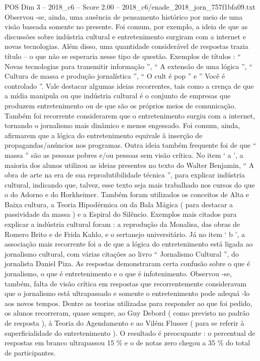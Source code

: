 \begin{textsample}{POS Dim 3 – 2018\_c6 – Score 2.00 – 2018\_c6/enade\_2018\_jorn\_757f1bfa09.txt}
Observou -se, ainda, uma ausência de pensamento histórico por meio de uma visão baseada somente no presente.
Foi comum, por exemplo, a ideia de que as discussões sobre indústria cultural e entretenimento surgiram com a internet e novas tecnologias.
Além disso, uma quantidade considerável de respostas trazia título – o que não se esperaria nesse tipo de questão.
Exemplos de títulos : “ Novas tecnologias para transmitir informação ”, “ A extensão de uma lógica ”, “ Cultura de massa e produção jornalística ”, “ O cult é pop ” e ” Você é controlado ”.
Vale destacar algumas ideias recorrentes, tais como a crença de que a mídia manipula ou que indústria cultural é o conjunto de empresas que produzem entretenimento ou de que são os próprios meios de comunicação.
Também foi recorrente considerarem que o entretenimento surgiu com a internet, tornando o jornalismo mais dinâmico e menos engessado.
Foi comum, ainda, afirmarem que a lógica do entretenimento equivale à inserção de propagandas/anúncios nos programas.
Outra ideia também frequente foi de que “ massa ” são as pessoas pobres e/ou pessoas sem visão crítica.
No item ‘ a ’, a maioria dos alunos utilizou as ideias presentes no texto do Walter Benjamin, “ A obra de arte na era de sua reprodutibilidade técnica ”, para explicar indústria cultural, indicando que, talvez, esse texto seja mais trabalhado nos cursos do que o do Adorno e do Horkheimer.
Também foram utilizados os conceitos de Alta e Baixa cultura, a Teoria Hipodérmica ou da Bala Mágica ( para destacar a passividade da massa ) e a Espiral do Silêncio.
Exemplos mais citados para explicar a indústria cultural foram : a reprodução da Monalisa, das obras de Romero Brito e de Frida Kahlo, e o sertanejo universitário.
Já no item ‘ b ’, a associação mais recorrente foi a de que a lógica do entretenimento está ligada ao jornalismo cultural, com várias citações ao livro “ Jornalismo Cultural ”, do jornalista Daniel Piza.
As respostas demonstraram certa confusão sobre o que é jornalismo, o que é entretenimento e o que é infotenimento.
Observou -se, também, falta de visão crítica em respostas que recorrentemente consideravam que o jornalismo está ultrapassado e somente o entretenimento pode adequá -lo aos novos tempos.
Dentre as teorias utilizadas para responder ao que foi pedido, os alunos recorreram, quase sempre, ao Guy Debord ( como previsto no padrão de resposta ), à Teoria do Agendamento e ao Vilém Flusser ( para se referir à superficialidade do entretenimento ).
O resultado é preocupante : o percentual de respostas em branco ultrapassou 15 \% e o de notas zero chegou a 35 \% do total de participantes.

\end{textsample}
